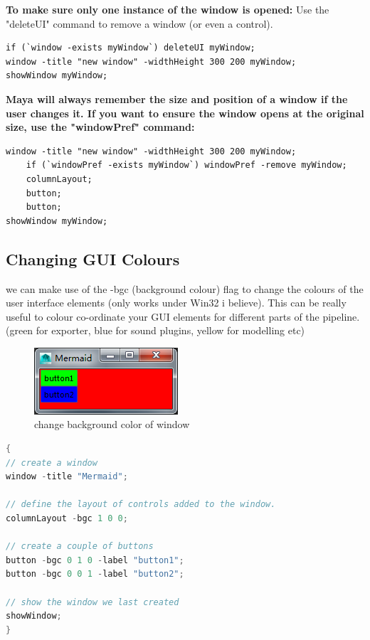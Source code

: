 \textbf{To make sure only one instance of the window is opened:}
Use the "deleteUI" command to remove a window (or even a control).

\begin{lstlisting}
if (`window -exists myWindow`) deleteUI myWindow;
window -title "new window" -widthHeight 300 200 myWindow;
showWindow myWindow;
\end{lstlisting}

\textbf{Maya will always remember the size and position of a window if the user changes it.
If you want to ensure the window opens at the original size, use the "windowPref" command:}

\begin{lstlisting}
window -title "new window" -widthHeight 300 200 myWindow;
	if (`windowPref -exists myWindow`) windowPref -remove myWindow;
	columnLayout;
	button;
	button;
showWindow myWindow;
\end{lstlisting}

\subsection{Changing GUI Colours}
we can make use of the -bgc (background colour) flag to change the colours of the user interface elements (only works under Win32 i believe). This can be really useful to colour co-ordinate your GUI elements for different parts of the pipeline. (green for exporter, blue for sound plugins, yellow for modelling etc)

\begin{figure}[tbh]
	\centering
	\includegraphics[width=0.3\linewidth]{figures/GUI/colored_window}
	\caption{change background color of window}
	\label{fig:coloredwindow}
\end{figure}

\begin{lstlisting}[language = C++]
{
// create a window
window -title "Mermaid";

// define the layout of controls added to the window.
columnLayout -bgc 1 0 0;

// create a couple of buttons
button -bgc 0 1 0 -label "button1";
button -bgc 0 0 1 -label "button2";

// show the window we last created
showWindow;
}
\end{lstlisting}

